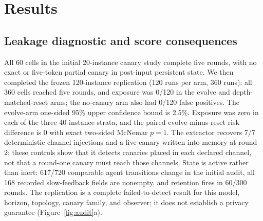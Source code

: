 \documentclass[11pt]{article}
\begin{document}
\section{Results}

\subsection{Leakage diagnostic and score consequences}
\label{sec:res-audit}

All 60 cells in the initial 20-instance canary study complete five rounds, with no exact or five-token partial canary in post-input persistent state. We then completed the frozen 120-instance replication (120 runs per arm, 360 runs): all 360 cells reached five rounds, and exposure was 0/120 in the evolve and depth-matched-reset arms; the no-canary arm also had 0/120 false positives. The evolve-arm one-sided 95\% upper confidence bound is 2.5\%. Exposure was zero in each of the three 40-instance strata, and the paired evolve-minus-reset risk difference is 0 with exact two-sided McNemar $p=1$. The extractor recovers 7/7 deterministic channel injections and a live canary written into memory at round 2; these controls show that it detects canaries placed in each declared channel, not that a round-one canary must reach those channels. State is active rather than inert: 617/720 comparable agent transitions change in the initial audit, all 168 recorded slow-feedback fields are nonempty, and retention fires in 60/300 rounds. The replication is a complete failed-to-detect result for this model, horizon, topology, canary family, and observer; it does not establish a privacy guarantee (Figure~\ref{fig:audit}a).
\end{document}
